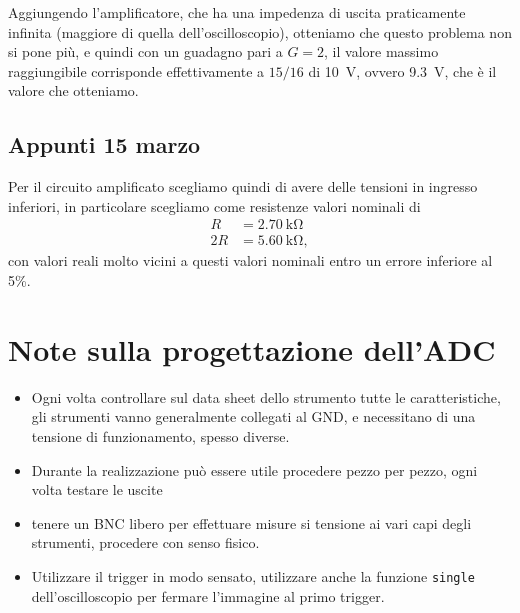 \documentclass[
    rmp,
    reprint, 
    superscriptaddress, 
    altaffilletter, 
    amsmath, 
    amssymb, 
    a4paper]{revtex4-2}
\begin{document}
Aggiungendo l'amplificatore, che ha una impedenza di uscita praticamente infinita (maggiore di quella dell'oscilloscopio), otteniamo che questo problema non si pone più, e quindi con un guadagno pari a $G=2$, il valore massimo raggiungibile corrisponde effettivamente a $15/16$ di \SI{10}{\volt}, ovvero \SI{9.3}{\volt}, che è il valore che otteniamo.  

\subsection{Appunti 15 marzo}
Per il circuito amplificato scegliamo quindi di avere delle tensioni in ingresso inferiori, in particolare scegliamo come resistenze valori nominali di \begin{align*}
    R &= \SI{2.70}{\kilo\ohm}\\
    2R &= \SI{5.60}{\kilo\ohm},
\end{align*} con valori reali molto vicini a questi valori nominali entro un errore inferiore al 5\%.

\section{Note sulla progettazione dell'ADC}
\begin{itemize}
    \item Ogni volta controllare sul data sheet dello strumento tutte le caratteristiche, gli strumenti vanno generalmente collegati al GND, e necessitano di una tensione di funzionamento, spesso diverse. 
    \item Durante la realizzazione può essere utile procedere pezzo per pezzo, ogni volta testare le uscite
    \item tenere un BNC libero per effettuare misure si tensione ai vari capi degli strumenti, procedere con senso fisico. 
    \item Utilizzare il trigger in modo sensato, utilizzare anche la funzione \verb-single- dell'oscilloscopio per fermare l'immagine al primo trigger.
\end{itemize}
    

\appendix

\setcounter{table}{0}
\renewcommand{\thetable}{A-\Roman{table}}
\end{document}
